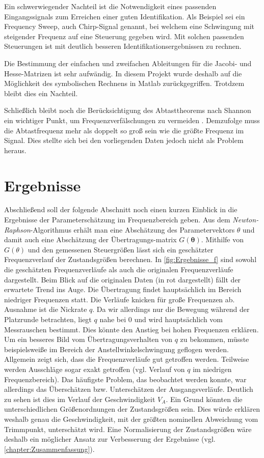 Ein schwerwiegender Nachteil ist die Notwendigkeit eines passenden Eingangssignals zum Erreichen einer guten Identifikation. 
Als Beispiel sei ein Frequency Sweep, auch Chirp-Signal genannt, bei welchem eine Schwingung mit steigender Frequenz auf eine 
Steuerung gegeben wird. Mit solchen passenden Steuerungen ist mit deutlich besseren Identifikationsergebnissen zu rechnen.\par
Die Bestimmung der einfachen und zweifachen Ableitungen für die Jacobi- und Hesse-Matrizen ist sehr aufwändig. In diesem 
Projekt wurde deshalb auf die Möglichkeit des symbolischen Rechnens in Matlab zurückgegriffen. Trotdzem bleibt dies ein 
Nachteil.\par
Schließlich bleibt noch die Berücksichtigung des Abtasttheorems nach Shannon ein wichtiger Punkt, um Frequenzverfälschungen 
zu vermeiden \cite{Grimm2017}. Demzufolge muss die Abtastfrequenz mehr als doppelt so groß sein wie die größte Frequenz im 
Signal. Dies stellte sich bei den vorliegenden Daten jedoch nicht als Problem heraus.



\section{Ergebnisse}
Abschließend soll der folgende Abschnitt noch einen kurzen Einblick in die Ergebnisse der Parameterschätzung im 
Frequenzbereich geben. Aus dem \textit{Newton-Raphson}-Algorithmus erhält man eine Abschätzung des Parametervektors $\theta$ 
und damit auch eine Abschätzung der Übertragungs-matrix $G\mathbf{(\theta)}$. Mithilfe von $G(\theta)$ und den gemessenen 
Steuergrößen lässt sich ein geschätzter Frequenzverlauf der Zustandsgrößen berechnen.
In \cref{fig:Ergebnisse_f} sind sowohl die geschätzten Frequenzverläufe als auch die originalen 
Frequenzverläufe dargestellt. Beim Blick auf die originalen Daten (in rot dargestellt) fällt der erwartete Trend ins Auge. 
Die Übertragung findet hauptsächlich im Bereich niedriger Frequenzen statt. Die Verläufe knicken für große Frequenzen ab. 
Ausnahme ist die Nickrate $q$. Da wir allerdings nur die Bewegung während der Platzrunde betrachten, liegt $q$ nahe bei $ 0 $ 
und wird hauptsächlich vom Messrauschen bestimmt. Dies könnte den Anstieg bei hohen Frequenzen erklären. Um ein besseres Bild 
vom Übertragungsverhalten von $q$ zu bekommen, müsste beispielsweiße im Bereich der Anstellwinkelschwingung geflogen werden. 
Allgemein zeigt sich, dass die Frequenzverläufe gut getroffen werden. Teilweise werden Ausschläge sogar exakt 
getroffen (vgl. Verlauf von $q$ im niedrigen Frequenzbereich). Das häufigste Problem, das beobachtet werden konnte, war 
allerdings das Überschätzen bzw. Unterschätzen der Ausgangsverläufe. Deutlich zu sehen ist dies im Verlauf der 
Geschwindigkeit $V_{A}$. Ein Grund könnten die unterschiedlichen Größenordnungen der Zustandsgrößen sein. Dies würde erklären 
weshalb genau die Geschwindigkeit, mit der größten nominellen Abweichung vom Trimmpunkt, unterschätzt wird. Eine 
Normalisierung der Zustandsgrößen wäre deshalb ein möglicher Ansatz zur Verbesserung der Ergebnisse (vgl. 
\cref{chapter:Zusammenfassung}). 

